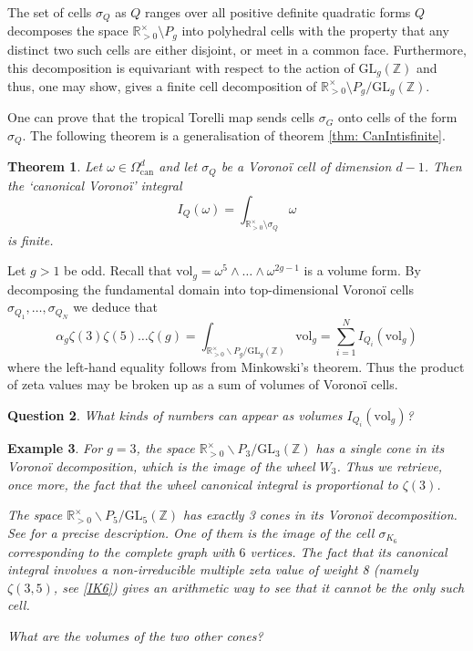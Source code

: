 \documentclass[12pt]{amsart}
\newcommand{\RR}{{\mathbb R}}
\newcommand{\ZZ}{{\mathbb Z}}
\theoremstyle{plain}
\newtheorem{thm}{Theorem}
\newtheorem{quest}[thm]{Question}
\newtheorem{ex}[thm]{Example}
\newcommand{\LM}{L\mathcal{M}}
\newcommand{\GL}{\mathrm{GL}}
\newcommand{\trop}{\mathrm{trop}}
\newcommand{\0}{\color{blue}{\mathsf{0}}}
\begin{document}
The set of cells $\sigma_Q$ as $Q$ ranges over all positive definite quadratic forms $Q$ decomposes the space $\RR^{\times}_{>0} \setminus P_g$ into polyhedral cells with the property that any distinct two such cells are either disjoint, or meet in a common face. Furthermore, this decomposition is equivariant with respect to the action of $\GL_g(\ZZ)$ and thus, one may show, gives  a finite cell decomposition of  $\RR^{\times}_{>0} \setminus P_g/\GL_g(\ZZ)$. 

One can prove \cite{AlexeevBrunyate} that the tropical Torelli map sends cells $\sigma_G$ onto cells of the form   $\sigma_Q$.
The following theorem is a generalisation of theorem \ref{thm: CanIntisfinite}. 


\begin{thm}  \cite{brown2023bordifications} \label{thm: IQomegafinite} Let $\omega\in \Omega^{d}_\mathrm{can}$ and let $\sigma_Q$ be a Vorono\"i  cell of dimension $d-1$. Then  the `canonical Vorono\"i' integral  
\[ I_Q(\omega) = \int_{\RR_{>0}^{\times} \setminus  \sigma_Q} \omega\]
is finite. 
\end{thm} 


   Let $g>1$ be odd. Recall that $\mathrm{vol}_g = \omega^5 \wedge \ldots \wedge  \omega^{2g-1}$ is a  volume form. 
By decomposing the fundamental domain into top-dimensional Vorono\"i cells $\sigma_{Q_1},\ldots, \sigma_{Q_N}$ we deduce that 
\[   \alpha_g \zeta(3) \zeta(5) \ldots \zeta(g)  = \int_{\RR^{\times}_{>0} \backslash  P_g/\GL_g(\ZZ)} \mathrm{vol}_g = \sum_{i=1}^N  I_{Q_i} (\mathrm{vol}_g)\]
where the left-hand equality follows from Minkowski's theorem. Thus the product of zeta values may be broken up as a sum of volumes of Vorono\"i cells. 

\begin{quest}
    What kinds of numbers can appear as volumes  $I_{Q_i}(\mathrm{vol}_g)$?
\end{quest}




\begin{ex} For $g=3$, the space $\RR^{\times}_{>0} \backslash  P_3/\GL_3(\ZZ)$ has a single cone in its Vorono\"i decomposition, which is the image of the wheel $W_3$.
Thus we retrieve, once more, the fact that the wheel canonical integral is proportional to $\zeta(3)$.


The space $\RR^{\times}_{>0} \backslash  P_5/\GL_5(\ZZ)$ has exactly 3 cones in its Vorono\"i decomposition.  See \cite{TopWeightAg, ElbazVincentGanglSoule} for a precise description. One of them  is the image of the cell $\sigma_{K_6}$ corresponding to the complete graph with $6$ vertices.  The fact that its canonical integral involves a non-irreducible multiple zeta value of weight 8 (namely $\zeta(3,5)$, see \eqref{IK6})  gives an arithmetic way to see that it cannot be the only such cell. 

What are the volumes of the two other cones? 
\end{ex} 
\end{document}
